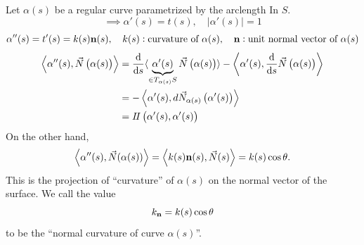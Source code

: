     Let \(\alpha(s)\) be a regular curve parametrized by the arclength In
    \(S\). 
    \[
        \implies \alpha'(s)=t(s),\quad \left|\alpha'(s)\right|=1
    \]
    \[
        \alpha''(s)=t'(s)=k(s)\vb{n}(s),\quad k(s):\text{curvature of
        }\alpha(s),\quad\vb{n}:\text{unit normal vector of }\alpha(s)
    \]
\begin{align*}
    \left\langle\alpha''(s),\vec{N}\left(\alpha(s)\right)\right\rangle
    &=\dv{s}\langle\underbrace{\alpha'(s)}_{\in T_{\alpha(s)}S}
    \vec{N}\left(\alpha(s)\right)\rangle-\left\langle
        \alpha'(s),\dv{s}\vec{N}\left(\alpha(s)\right)
    \right\rangle\\
    &=-\left\langle\alpha'(s),d\vec{N}_{\alpha(s)}\left(\alpha'(s)
    \right)\right\rangle\\
    &=I\!I\left(\alpha'(s),\alpha'(s)\right)
\end{align*}
On the other hand, 
\[
    \left\langle\alpha''(s),\vec{N}(\alpha(s))\right\rangle    
    =\left\langle k(s) \vb{n}(s),\vec{N}(s)\right\rangle
    =k(s)\cos \theta.
\]
This is the projection of ``curvature'' of \(\alpha(s)\) on the normal
vector of the surface. We call the value
\[
    k_{\vb{n}}=k(s)\cos \theta
\]
to be the ``normal curvature of curve \(\alpha(s)\)''.

